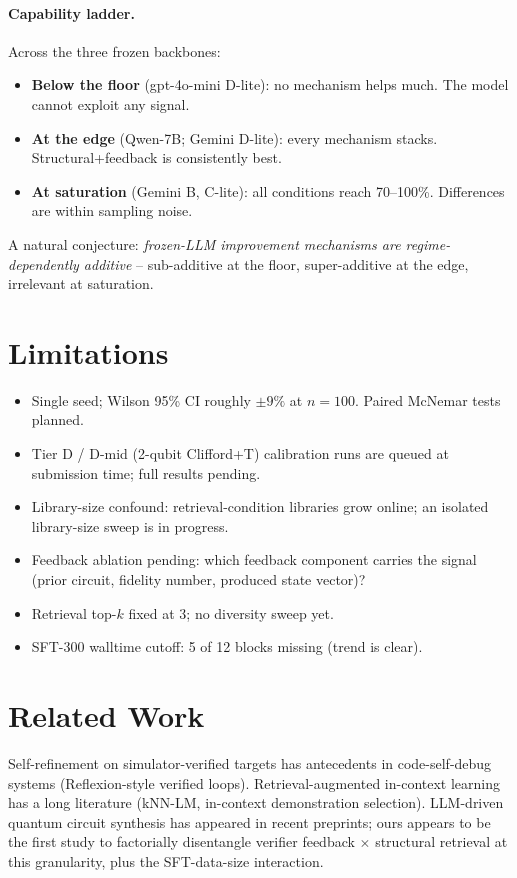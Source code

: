\documentclass[11pt]{article}
\begin{document}
\paragraph{Capability ladder.} Across the three frozen backbones:
\begin{itemize}[leftmargin=*,topsep=2pt,itemsep=0pt]
    \item \textbf{Below the floor} (gpt-4o-mini D-lite): no mechanism helps much. The model cannot exploit any signal.
    \item \textbf{At the edge} (Qwen-7B; Gemini D-lite): every mechanism stacks. Structural+feedback is consistently best.
    \item \textbf{At saturation} (Gemini B, C-lite): all conditions reach 70--100\%. Differences are within sampling noise.
\end{itemize}
A natural conjecture: \emph{frozen-LLM improvement mechanisms are regime-dependently additive} -- sub-additive at the floor, super-additive at the edge, irrelevant at saturation.

\section{Limitations}

\begin{itemize}[leftmargin=*,topsep=2pt,itemsep=0pt]
    \item Single seed; Wilson 95\% CI roughly $\pm 9\%$ at $n=100$. Paired McNemar tests planned.
    \item Tier D / D-mid (2-qubit Clifford+T) calibration runs are queued at submission time; full results pending.
    \item Library-size confound: retrieval-condition libraries grow online; an isolated library-size sweep is in progress.
    \item Feedback ablation pending: which feedback component carries the signal (prior circuit, fidelity number, produced state vector)?
    \item Retrieval top-$k$ fixed at 3; no diversity sweep yet.
    \item SFT-300 walltime cutoff: 5 of 12 blocks missing (trend is clear).
\end{itemize}

\section{Related Work}

Self-refinement on simulator-verified targets has antecedents in code-self-debug systems (Reflexion-style verified loops). Retrieval-augmented in-context learning has a long literature (kNN-LM, in-context demonstration selection). LLM-driven quantum circuit synthesis has appeared in recent preprints; ours appears to be the first study to factorially disentangle verifier feedback $\times$ structural retrieval at this granularity, plus the SFT-data-size interaction.
\end{document}
